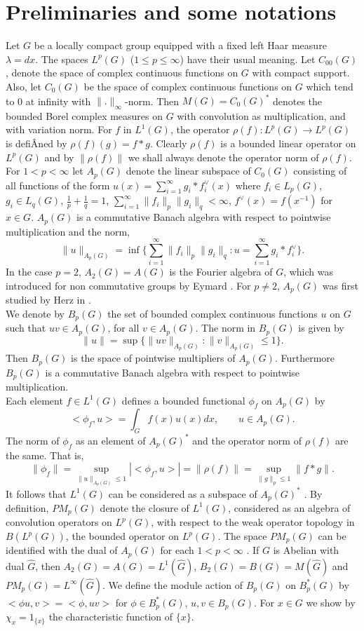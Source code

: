 \section{Preliminaries and some notations}
Let $G$ be a locally compact group equipped with a fixed left Haar measure $\lambda= dx$. The spaces $L^p(G)$ ($1\leq p\leq\infty$) have their usual meaning. Let $C_{00}(G)$, denote the space of complex continuous functions on $G$ with compact support. Also, let $C_0(G)$ be the space of complex continuous functions on $G$ which tend to 0 at infinity with $\|.\|_{\infty}$-norm. Then $M(G) = C_0(G)^*$  denotes the bounded Borel complex measures	on $G$ with convolution as multiplication, and with variation norm. For $f$ in $L^1(G)$,
the operator $\rho(f): L^p(G) \longrightarrow L^p(G)$ is defiÂned by $\rho(f)(g) = f*g$. Clearly $\rho(f)$ is a bounded linear operator on $L^p(G)$ and by $\|\rho(f)\|$ we shall always denote the operator norm of $\rho(f)$. \\
\indent
For $1 < p < \infty$ let $A_p(G)$ denote the linear subspace of $C_0(G)$ consisting of all
functions of the form $u(x)=\sum_{i=1}^{\infty}g_i*f^{\vee}_i(x)$ where $f_i\in L_p(G)$, $g_i\in L_q(G)$, $\frac{1}{p}+\frac{1}{q}=1$, $\sum_{i=1}^{\infty}\|f_i\|_p\|g_i\|_q<\infty$, $f^{\vee}(x)=f(x^{-1})$ for $x\in G$. $A_p(G)$ is a commutative Banach algebra with respect to pointwise multiplication and the norm,
$$\|u\|_{A_p(G)}=\inf\{\sum_{i=1}^{\infty}\|f_i\|_p\|g_i\|_q: u=\sum_{i=1}^{\infty}g_i*f^{\vee}_i\}.$$
In the case $p = 2$, $A_2(G) = A(G)$ is the Fourier algebra of $G$, which was introduced for non commutative groups by Eymard \cite{3}. For $p\not= 2$, $A_p(G)$ was first studied by Herz in \cite{7}.\\
\indent
We denote by $B_p(G)$ the set of bounded complex continuous functions $u$ on $G$ such that $uv\in A_p(G)$, for all $v\in A_p(G)$. The norm in $B_p(G)$ is given by
$$\|u\|=\sup\{\|uv\|_{A_p(G)}: \|v\|_{A_p(G)}\leq 1\}.$$
Then $B_p(G)$ is the space of pointwise multipliers of $A_p(G)$. Furthermore $B_p(G)$ is
a commutative Banach algebra with respect to pointwise multiplication. \\
\indent
Each element $f\in L^1(G)$ defines a bounded functional $\phi_f$ on $A_p(G)$ by
$$<\phi_f,u>=\int_Gf(x)u(x)dx,\qquad u\in A_p(G).$$
The norm of $\phi_f$ as an element of $A_p(G)^*$ and the operator norm of $\rho(f)$ are the
same. That is,
$$\|\phi_f\|=\sup_{\|u\|_{A_p(G)}\leq 1}|<\phi_f,u>|=\|\rho(f)\|=\sup_{\|g\|_p\leq 1}\|f*g\|.$$
It follows that $L^1(G)$ can be considered as a subspace of $A_p(G)^*$ \cite{1}. By definition, $PM_p(G)$ denote the closure of $L^1(G)$, considered as an algebra of convolution operators on $L^p(G)$, with respect to the weak operator topology in $B(L^p(G))$, the bounded operator on $L^p(G)$. The space $PM_p(G)$ can be identified with the dual of $A_p(G)$ for each $1 < p < \infty$ \cite{1}. If $G$ is Abelian with dual $\hat{G}$, then $A_2(G) = A(G) = L^1(\hat{G})$, $B_2(G) = B(G) = M(\hat{G})$ and $PM_p(G) = L^{\infty}(\hat{G})$. We define the module action of $B_p(G)$ on $B^*_p(G)$ by $<\phi u, v>=<\phi ,uv>$ for $\phi\in B^*_p(G)$, $u, v \in B_p(G)$. For $x\in G$ we show by $\chi_x=1_{\{x\}}$ the characteristic function of $\{x\}$.
